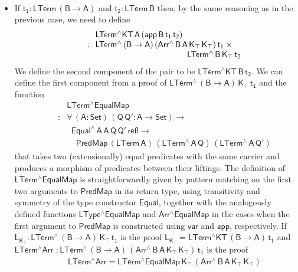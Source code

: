 \documentclass[sigplan,10pt,anonymous,review]{acmart}
\begin{document}
\begin{itemize}
\[\begin{array}{ll}
\end{array}\]
\item If $\mathsf{t_1 : LTerm\,(B \to A)}$ and $\mathsf{t_2 :
  LTerm\,B}$ then, by the same reasoning as in the previous case, we
  need to define
  \[\begin{array}{ll}
 & \!\! \mathsf{LTerm^\wedge KT\,A\, (app\, B \, t_1\,t_2)}\\
\quad\quad : &\!\! \mathsf{LTerm^{\wedge}\, (B \to A)\, (Arr^{\wedge} \, B\, A\,
  K_\top \, K_\top)\, t_1\; \times}\\
 & \hspace*{1.5in} \mathsf{LTerm^{\wedge}\, B\, K_\top\, t_2}
  \end{array}\]
  We define the second component of the pair to be
  $\mathsf{LTerm^\wedge KT\,B\,t_2}$. We can define the first
  component from a proof of $\mathsf{LTerm^{\wedge}\, (B \to A)\,
    K_\top\, t_1}$ and the function
  \[\begin{array}{ll}
  & \!\! \mathsf{LTerm^\wedge EqualMap}\\
  \quad\quad : &
  \!\!\mathsf{\forall\, (A : Set)\, (Q\,Q' : A \to
    Set) \to}\\
  & \;\;\mathsf{Equal^\wedge\,A\,A\,Q\,Q'\,refl \to}\\
  &  \;\;\;\;\mathsf{PredMap\,(LTerm\,A)\,
    (LTerm^{\wedge}\,A\,Q)\,(LTerm^{\wedge}\,A\,Q')}
  \end{array}\] that takes two
  (extensionally) equal predicates with the same carrier and produces
  a morphism of predicates between their liftings. The definition of
  $\mathsf{LTerm^\wedge EqualMap}$ is straightforwardly given by
  pattern matching on the first two arguments to $\mathsf{PredMap}$ in
  its return type, using transitivity and symmetry of the type
  constructor $\mathsf{Equal}$, together with the analogously defined
  functions $\mathsf{LType^\wedge EqualMap}$ and $\mathsf{Arr^\wedge
    EqualMap}$ in the cases when the first argument to
  $\mathsf{PredMap}$ is constructed using $\mathsf{var}$ and
  $\mathsf{app}$, respectively. If $\mathsf{L_{K_\top} :
    LTerm^{\wedge}\, (B \to A) \, K_\top\, t_1}$ is the proof
  $\mathsf{L_{K_\top} = LTerm^\wedge KT\, (B \to A)\, t_1}$ and
  $\mathsf{ LTerm^\wedge Arr}$ $\mathsf{: LTerm^{\wedge}\, (B \to A)\,
    (Arr^{\wedge} \, B\, A\, K_\top \, K_\top)\, t_1}$ is the proof
  \[\begin{array}{l}
   \quad\quad  \mathsf{LTerm^\wedge Arr = LTerm^\wedge
    EqualMap\,K_\top\,(Arr^{\wedge}\,B\,A\,K_\top\,K_\top)}\\

\end{array}\]
\end{itemize}
\end{document}
